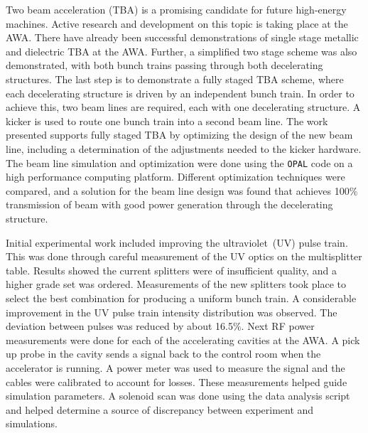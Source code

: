
Two beam acceleration (TBA) is a promising candidate for future high-energy machines. 
Active research and development on this topic is taking place at the AWA. 
There have already been successful demonstrations of single stage metallic and dielectric TBA at the AWA. 
Further, a simplified two stage scheme was also demonstrated, with both bunch trains passing through both decelerating structures. 
The last step is to demonstrate a fully staged TBA scheme, where each decelerating structure is driven by an independent bunch train.  
In order to achieve this, two beam lines are required, each with one decelerating structure.   
A kicker is used to route one bunch train into a second beam line. 
The work presented supports fully staged TBA by optimizing the design of the new beam line, 
including a determination of the adjustments needed to the kicker hardware.  
The beam line simulation and optimization were done using the \verb|OPAL| code on a high performance computing platform.  
Different optimization techniques were compared, and a solution for the beam line design was found that achieves 
100\% transmission of beam with good power generation through the decelerating structure. 

Initial experimental work included improving the ultraviolet~(UV) pulse train. 
This was done through careful measurement of the UV optics on the multisplitter table. 
Results showed the current splitters were of insufficient quality, and a higher grade set was ordered. 
Measurements of the new splitters took place to select the best combination for producing a uniform bunch train.
A considerable improvement in the UV pulse train intensity distribution was observed. 
The deviation between pulses was reduced by about 16.5\%.
Next RF power measurements were done for each of the accelerating cavities at the AWA. 
A pick up probe in the cavity sends a signal back to the control room when the accelerator is running. 
A power meter was used to measure the signal and the cables were calibrated to account for losses.  
These measurements helped guide simulation parameters. A solenoid scan was done using the data analysis script
and helped determine a source of discrepancy between experiment and simulations.

